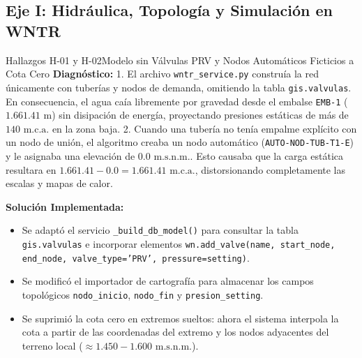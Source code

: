 \documentclass[11pt,letterpaper]{article}
\begin{document}
\subsection{Eje I: Hidráulica, Topología y Simulación en WNTR}

\begin{hallazgobox}{Hallazgos H-01 y H-02}{Modelo sin Válvulas PRV y Nodos Automáticos Ficticios a Cota Cero}
\textbf{Diagnóstico:} 
1. El archivo \texttt{wntr\_service.py} construía la red únicamente con tuberías y nodos de demanda, omitiendo la tabla \texttt{gis.valvulas}. En consecuencia, el agua caía libremente por gravedad desde el embalse \texttt{EMB-1} ($1.661.41\text{ m}$) sin disipación de energía, proyectando presiones estáticas de más de $140\text{ m.c.a.}$ en la zona baja.
2. Cuando una tubería no tenía empalme explícito con un nodo de unión, el algoritmo creaba un nodo automático (\texttt{AUTO-NOD-TUB-T1-E}) y le asignaba una elevación de $0.0\text{ m.s.n.m.}$. Esto causaba que la carga estática resultara en $1.661.41 - 0.0 = 1.661.41\text{ m.c.a.}$, distorsionando completamente las escalas y mapas de calor.

\textbf{Solución Implementada:}
\begin{itemize}
    \item Se adaptó el servicio \texttt{\_build\_db\_model()} para consultar la tabla \texttt{gis.valvulas} e incorporar elementos \texttt{wn.add\_valve(name, start\_node, end\_node, valve\_type='PRV', pressure=setting)}.
    \item Se modificó el importador de cartografía para almacenar los campos topológicos \texttt{nodo\_inicio}, \texttt{nodo\_fin} y \texttt{presion\_setting}.
    \item Se suprimió la cota cero en extremos sueltos: ahora el sistema interpola la cota a partir de las coordenadas del extremo y los nodos adyacentes del terreno local ($\approx 1.450 - 1.600\text{ m.s.n.m.}$).
\end{itemize}
\end{hallazgobox}
\end{document}

